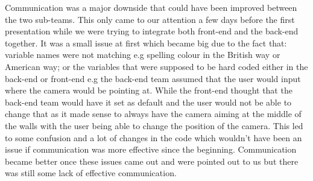 \documentclass[a4paper]{article}
\begin{document}
	Communication was a major downside that could have been improved between the two sub-teams. This only came to our attention a few days before the first presentation while we were trying to integrate both front-end and the back-end together. It was a small issue at first which became big due to the fact that: variable names were not matching e.g spelling colour in the British way or American way; or the variables that were supposed to be hard coded either in the back-end or front-end e.g the back-end team assumed that the user would input where the camera would be pointing at. While the front-end thought that the back-end team would have it set as default and the user would not be able to change that as it made sense to always have the camera aiming at the middle of the walls with the user being able to change the position of the camera. This led to some confusion and a lot of changes in the code which wouldn't have been an issue if communication was more effective since the beginning. Communication became better once these issues came out and were pointed out to us but there was still some lack of effective communication.
	
	
	
	
	
	
	
	
	\clearpage
	
	
\end{document}
